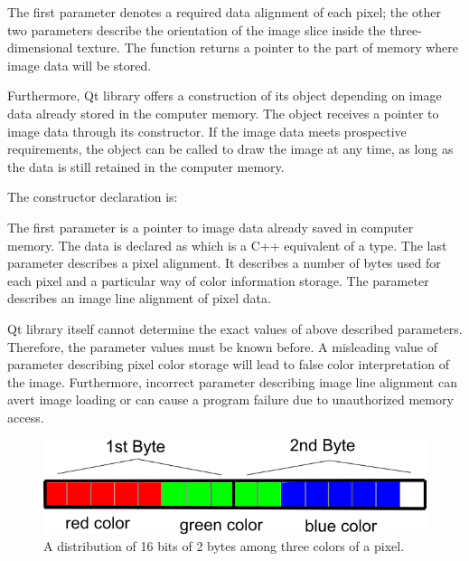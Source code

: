 
The first parameter denotes a required data alignment of each pixel; the other two parameters describe the orientation of the image slice inside the three-dimensional texture. The function returns a pointer to the part of memory where image data will be stored.

Furthermore, Qt library offers a construction of its object depending on image data already stored in the computer memory. The object receives a pointer to image data through its constructor. If the image data meets prospective requirements, the object can be called to draw the image at any time, as long as the data is still retained in the computer memory.

The constructor declaration is:


The first parameter is a pointer to image data already saved in computer memory. The data is declared as  which is a C++ equivalent of a  type. The last parameter  describes a pixel alignment. It describes a number of bytes used for each pixel and a particular way of color information storage. The  parameter describes an image line alignment of pixel data.

Qt library itself cannot determine the exact values of above described parameters. Therefore, the parameter values must be known before. A misleading value of parameter describing pixel color storage will lead to false color interpretation of the image. Furthermore, incorrect parameter describing image line alignment can avert image loading or can cause a program failure due to unauthorized memory access.  


\begin{figure}
	\begin{center}
	\includegraphics[width=130mm]{Text/IMG/ImageStoring_16bit.png}
	\end{center}
	\caption{A distribution of 16 bits of 2 bytes among three colors of a pixel.}
	\label{imagestoring}
\end{figure}

